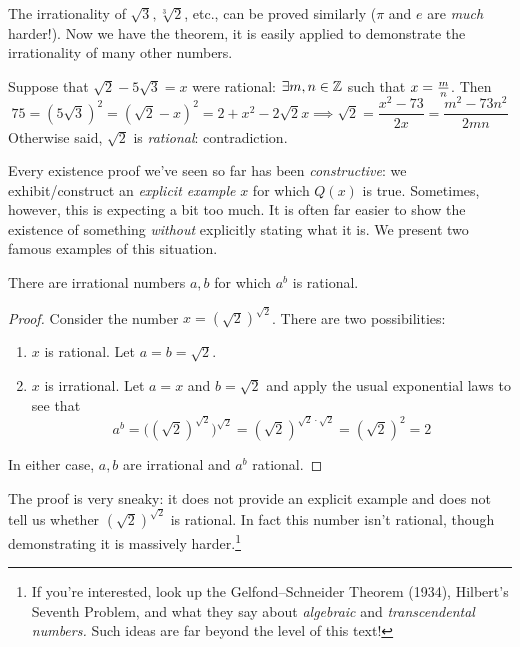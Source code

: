 The irrationality of $\sqrt 3,\sqrt[3]{2}$, etc., can be proved similarly ($\pi$ and $e$ are \emph{much} harder!). Now we have the theorem, it is easily applied to demonstrate the irrationality of many other numbers.



\begin{example}{}{}
	Suppose that $\sqrt 2-5\sqrt 3=x$ were rational: $\exists m,n\in\mathbb{Z}$ such that $x=\smash{\frac mn}$. Then
	\[
		75=(5\sqrt 3)^2=(\sqrt 2-x)^2=2+x^2-2\sqrt 2x \implies \sqrt 2=\frac{x^2-73}{2x} =\frac{m^2-73n^2}{2mn}
	\]
	Otherwise said, $\sqrt 2$ is \emph{rational}: contradiction.
\end{example}

\goodbreak



Every existence proof we've seen so far has been \emph{constructive}: we exhibit/construct an \emph{explicit example} $x$ for which $Q(x)$ is true. Sometimes, however, this is expecting a bit too much. It is often far easier to show the existence of something \emph{without} explicitly stating what it is. We present two famous examples of this situation.

\begin{thm}{}{}
	There are irrational numbers $a,b$ for which $a^b$ is rational.
\end{thm}

\begin{proof}
	Consider the number $x=(\sqrt 2)^{\sqrt 2}$. There are two possibilities:
	\begin{enumerate}
	  \item $x$ is rational. Let $a=b=\sqrt 2$.
	  \item $x$ is irrational. Let $a=x$ and $b=\sqrt 2$ and apply the usual exponential laws to see that
	  \[
	  	a^b=\bigl((\sqrt 2)^{\sqrt 2}\bigr)^{\sqrt 2}=(\sqrt 2)^{\sqrt 2\cdot\sqrt 2}= (\sqrt 2)^2=2
	  \]
	\end{enumerate}\vspace{-5pt}
	In either case, $a,b$ are irrational and $a^b$ rational.
\end{proof}

The proof is very sneaky: it does not provide an explicit example and does not tell us whether $(\sqrt 2)^{\sqrt 2}$ is rational. In fact this number isn't rational, though demonstrating it is massively harder.\footnote{If you're interested, look up the Gelfond--Schneider Theorem (1934), Hilbert's Seventh Problem, and what they say about \emph{algebraic} and \emph{transcendental numbers.} Such ideas are far beyond the level of this text!}
\bigbreak

